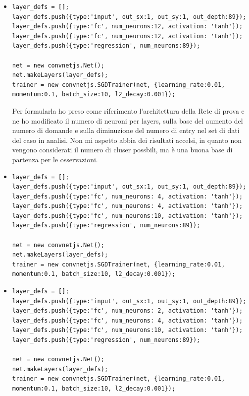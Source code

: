 \begin{itemize}
\item \begin{verbatim}
layer_defs = [];
layer_defs.push({type:'input', out_sx:1, out_sy:1, out_depth:89});
layer_defs.push({type:'fc', num_neurons:12, activation: 'tanh'});
layer_defs.push({type:'fc', num_neurons:12, activation: 'tanh'});
layer_defs.push({type:'regression', num_neurons:89});
        
net = new convnetjs.Net();
net.makeLayers(layer_defs);
trainer = new convnetjs.SGDTrainer(net, {learning_rate:0.01, 
momentum:0.1, batch_size:10, l2_decay:0.001});
\end{verbatim}
\noindent
Per formularla ho preso come riferimento l'architettura della Rete di prova e ne ho modificato il numero di neuroni per layers, sulla base del aumento del numero di domande e sulla diminuzione del numero di entry nel set di dati del caso in analisi. Non mi aspetto abbia dei risultati accelsi, in quanto non vengono considerati il numero di cluser possbili, ma è una buona base di partenza per le osservazioni.
\item \begin{verbatim}
layer_defs = [];
layer_defs.push({type:'input', out_sx:1, out_sy:1, out_depth:89});
layer_defs.push({type:'fc', num_neurons: 4, activation: 'tanh'});
layer_defs.push({type:'fc', num_neurons: 4, activation: 'tanh'});
layer_defs.push({type:'fc', num_neurons:10, activation: 'tanh'});
layer_defs.push({type:'regression', num_neurons:89});
        
net = new convnetjs.Net();
net.makeLayers(layer_defs);
trainer = new convnetjs.SGDTrainer(net, {learning_rate:0.01, 
momentum:0.1, batch_size:10, l2_decay:0.001});
\end{verbatim}

\item \begin{verbatim}
layer_defs = [];
layer_defs.push({type:'input', out_sx:1, out_sy:1, out_depth:89});
layer_defs.push({type:'fc', num_neurons: 2, activation: 'tanh'});
layer_defs.push({type:'fc', num_neurons: 4, activation: 'tanh'});
layer_defs.push({type:'fc', num_neurons:10, activation: 'tanh'});
layer_defs.push({type:'regression', num_neurons:89});
        
net = new convnetjs.Net();
net.makeLayers(layer_defs);
trainer = new convnetjs.SGDTrainer(net, {learning_rate:0.01, 
momentum:0.1, batch_size:10, l2_decay:0.001});
\end{verbatim}


\end{itemize}

